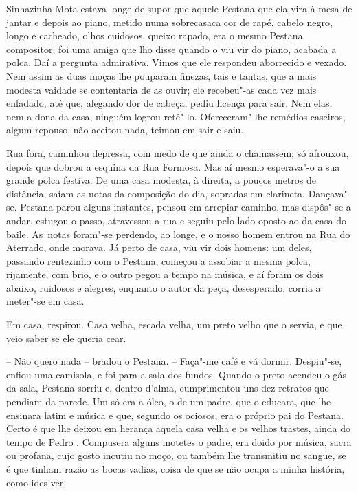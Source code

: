 Sinhazinha Mota estava longe de supor que aquele Pestana que ela vira à
mesa de jantar e depois ao piano, metido numa sobrecasaca cor de rapé,
cabelo negro, longo e cacheado, olhos cuidosos, queixo rapado, era o
mesmo Pestana compositor; foi uma amiga que lho disse quando o viu vir
do piano, acabada a polca. Daí a pergunta admirativa. Vimos que ele
respondeu aborrecido e vexado. Nem assim as duas moças lhe pouparam
finezas, tais e tantas, que a mais modesta vaidade se contentaria de as
ouvir; ele recebeu"-as cada vez mais enfadado, até que, alegando dor de
cabeça, pediu licença para sair. Nem elas, nem a dona da casa, ninguém
logrou retê"-lo. Ofereceram"-lhe remédios caseiros, algum repouso, não
aceitou nada, teimou em sair e saiu.

Rua fora, caminhou depressa, com medo de que ainda o chamassem; só
afrouxou, depois que dobrou a esquina da Rua Formosa. Mas aí mesmo
esperava"-o a sua grande polca festiva. De uma casa modesta, à direita, a
poucos metros de distância, saíam as notas da composição do dia,
sopradas em clarineta. Dançava"-se. Pestana parou alguns instantes,
pensou em arrepiar caminho, mas dispôs"-se a andar, estugou o passo,
atravessou a rua e seguiu pelo lado oposto ao da casa do baile. As~notas
foram"-se perdendo, ao longe, e o nosso homem entrou na Rua do Aterrado,
onde morava. Já perto de casa, viu vir dois homens: um deles, passando
rentezinho com o Pestana, começou a assobiar a mesma polca, rijamente,
com brio, e o outro pegou a tempo na música, e aí foram os dois abaixo,
ruidosos e alegres, enquanto o autor da peça, desesperado, corria a
meter"-se em casa.

Em casa, respirou. Casa velha, escada velha, um preto velho que o
servia, e que veio saber se ele queria cear.

-- Não quero nada -- bradou o Pestana. -- Faça"-me café e vá dormir.
Despiu"-se, enfiou uma camisola, e foi para a sala dos fundos. Quando o
preto acendeu o gás da sala, Pestana sorriu e, dentro d'alma,
cumprimentou uns dez retratos que pendiam da parede. Um só era a óleo, o
de um padre, que o educara, que lhe ensinara latim e música e que,
segundo os ociosos, era o próprio pai do Pestana. Certo é que lhe deixou
em herança aquela casa velha e os velhos trastes, ainda do tempo de
Pedro . Compusera alguns motetes o padre, era doido por música, sacra
ou profana, cujo gosto incutiu no moço, ou também lhe transmitiu no
sangue, se é que tinham razão as bocas vadias, coisa de que se não ocupa
a minha história, como ides ver.


